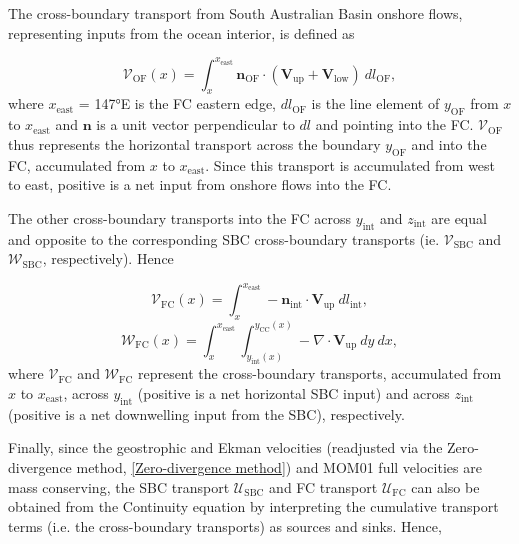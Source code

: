 \documentclass[preprint,3p,review,12pt]{elsarticle}
\renewcommand{\Vec}[1]{\mathbf{#1}}
\newcommand{\sub}[1]{_{\text{#1}}}
\begin{document}
The cross-boundary transport from South Australian Basin onshore flows, representing inputs from the ocean interior, is defined as

\begin{equation} \label{eq:8}
\mathcal{V}\sub{OF}(x) = \int_{x}^{x\sub{east}}\Vec{n}\sub{OF}\cdot(\Vec{V}\sub{up} + \Vec{V}\sub{low})\ dl\sub{OF},
\end{equation}
%
where $x\sub{east}$ = \ang{147}E is the FC eastern edge, $dl\sub{OF}$ is the line element of $y\sub{OF}$ from $x$ to $x\sub{east}$ and $\Vec{n}$ is a unit vector perpendicular to $dl$ and pointing into the FC\@. $\mathcal{V}\sub{OF}$ thus represents the horizontal transport across the boundary $y\sub{OF}$ and into the FC, accumulated from $x$ to $x\sub{east}$. Since this transport is accumulated from west to east, positive is a net input from onshore flows into the FC.

The other cross-boundary transports into the FC across $y\sub{int}$ and $z\sub{int}$ are equal and opposite to the corresponding SBC cross-boundary transports (ie. $\mathcal{V}\sub{SBC}$ and $\mathcal{W}\sub{SBC}$, respectively). Hence

\begin{equation} \label{eq:9}
\mathcal{V}\sub{FC}(x) = \int_{x}^{x\sub{east}}-\Vec{n}\sub{int}\cdot\Vec{V}\sub{up}\ dl\sub{int},
\end{equation}
%
\begin{equation} \label{eq:10}
\mathcal{W}\sub{FC}(x) = \int_{x}^{x\sub{east}} \int_{y\sub{int}(x)}^{y\sub{CC}(x)} -\nabla\cdot\Vec{V}\sub{up}\ dy\ dx,
\end{equation}
%
where $\mathcal{V}\sub{FC}$ and $\mathcal{W}\sub{FC}$ represent the cross-boundary transports, accumulated from $x$ to $x\sub{east}$, across $y\sub{int}$ (positive is a net horizontal SBC input) and across $z\sub{int}$ (positive is a net downwelling input from the SBC), respectively.

Finally, since the geostrophic and Ekman velocities (readjusted via the Zero-divergence method, \ref{Zero-divergence method}) and MOM01 full velocities are mass conserving, the SBC transport $\mathcal{U}\sub{SBC}$ and FC transport $\mathcal{U}\sub{FC}$ can also be obtained from the Continuity equation by interpreting the cumulative transport terms (i.e. the cross-boundary transports) as sources and sinks. Hence,
\end{document}
